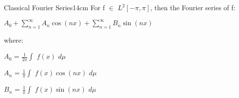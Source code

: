     \vspace{0.5cm}



    \begin{definition}{Classical Fourier Series}{14cm}
        For f $\in$ $L^2[-\pi,\pi]$, then the Fourier series of f:

        \hspace{0.5cm}
        $A_0 + \sum_{n=1}^{\infty} A_n \cos(nx) + \sum_{n=1}^{\infty} B_n \sin(nx)$

        where:

        \hspace{0.5cm}
        $A_0$ = $\frac{1}{2\pi} \int$ $f(x)$ $d\mu$

        \hspace{0.5cm}
        $A_n$ = $\frac{1}{\pi} \int$ $f(x) \cos(nx)$ $d\mu$

        \hspace{0.5cm}
        $B_n$ = $\frac{1}{\pi} \int$ $f(x) \sin(nx)$ $d\mu$
    \end{definition}





































